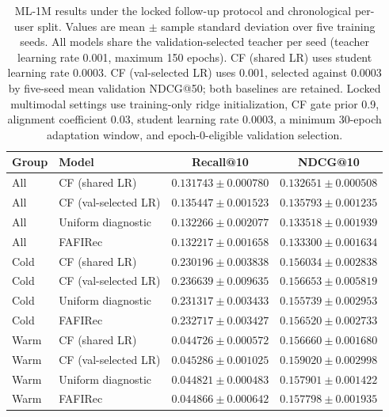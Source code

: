 \begin{table}[t]
\centering
\caption{ML-1M results under the locked follow-up protocol and chronological per-user split. Values are mean $\pm$ sample standard deviation over five training seeds. All models share the validation-selected teacher per seed (teacher learning rate 0.001, maximum 150 epochs). CF (shared LR) uses student learning rate 0.0003. CF (val-selected LR) uses 0.001, selected against 0.0003 by five-seed mean validation NDCG@50; both baselines are retained. Locked multimodal settings use training-only ridge initialization, CF gate prior 0.9, alignment coefficient 0.03, student learning rate 0.0003, a minimum 30-epoch adaptation window, and epoch-0-eligible validation selection.}
\label{tab:ml1m_stable_transfer_controls}
\begin{tabular}{llcc}
\toprule
Group & Model & Recall@10 & NDCG@10 \\
\midrule
All & CF (shared LR) & $0.131743 \pm 0.000780$ & $0.132651 \pm 0.000508$ \\
All & CF (val-selected LR) & $0.135447 \pm 0.001523$ & $0.135793 \pm 0.001235$ \\
All & Uniform diagnostic & $0.132266 \pm 0.002077$ & $0.133518 \pm 0.001939$ \\
All & FAFIRec & $0.132217 \pm 0.001658$ & $0.133300 \pm 0.001634$ \\
Cold & CF (shared LR) & $0.230196 \pm 0.003838$ & $0.156034 \pm 0.002838$ \\
Cold & CF (val-selected LR) & $0.236639 \pm 0.009635$ & $0.156653 \pm 0.005819$ \\
Cold & Uniform diagnostic & $0.231317 \pm 0.003433$ & $0.155739 \pm 0.002953$ \\
Cold & FAFIRec & $0.232717 \pm 0.003427$ & $0.156520 \pm 0.002733$ \\
Warm & CF (shared LR) & $0.044726 \pm 0.000572$ & $0.156660 \pm 0.001680$ \\
Warm & CF (val-selected LR) & $0.045286 \pm 0.001025$ & $0.159020 \pm 0.002998$ \\
Warm & Uniform diagnostic & $0.044821 \pm 0.000483$ & $0.157901 \pm 0.001422$ \\
Warm & FAFIRec & $0.044866 \pm 0.000642$ & $0.157798 \pm 0.001935$ \\
\bottomrule
\end{tabular}
\end{table}
